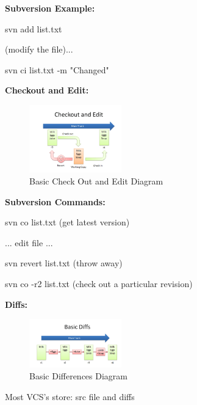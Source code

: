 \documentclass{article}
\begin{document}
\begin{flushleft}
\textbf{Subversion Example:} \\
\par

svn add list.txt \par

(modify the file)... \par

svn ci list.txt -m "Changed" \\
\par

\textbf{Checkout and Edit:} \\
\par

\begin{figure}[htp]
\centering
\includegraphics[width=4cm]{CheckOutAndEdit.png}
\caption{Basic Check Out and Edit Diagram}
\label{fig:BCOEDiagram}
\end{figure} 

\textbf{Subversion Commands:} \\
\par

svn co list.txt (get latest version) \par
... edit file ... \par
svn revert list.txt (throw away) \par
svn co -r2 list.txt (check out a particular revision) \\
\par

\textbf{Diffs:} \\
\par

\begin{figure}[htp]
\centering
\includegraphics[width=4cm]{Diff.png}
\caption{Basic Differences Diagram}
\label{fig:BDDiagram}
\end{figure} 

Most VCS's store: src file and diffs


\end{flushleft}
\end{document}
